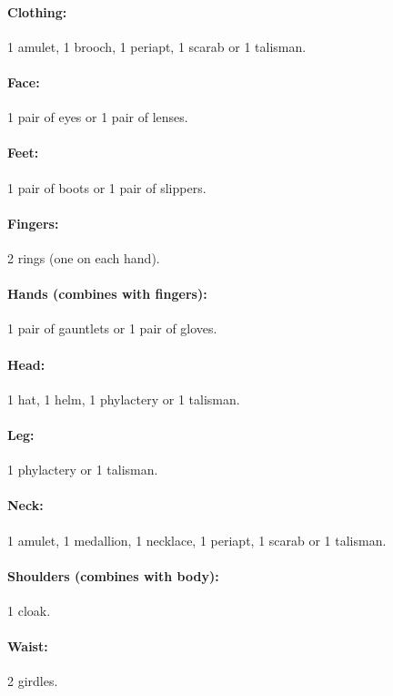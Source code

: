 \begin{multicols}{2}
\paragraph{Clothing:} 1 amulet, 1 brooch, 1 periapt, 1 scarab or 1 talisman.

\paragraph{Face:} 1 pair of eyes or 1 pair of lenses.

\paragraph{Feet:} 1 pair of boots or 1 pair of slippers.

\paragraph{Fingers:} 2 rings (one on each hand).

\paragraph{Hands (combines with fingers):} 1 pair of gauntlets or 1 pair of gloves.

\paragraph{Head:} 1 hat, 1 helm, 1 phylactery or 1 talisman.

\paragraph{Leg:} 1 phylactery or 1 talisman.

\paragraph{Neck:} 1 amulet, 1 medallion, 1 necklace, 1 periapt, 1 scarab or 1 talisman.

\paragraph{Shoulders (combines with body):} 1 cloak.

\paragraph{Waist:} 2 girdles.


\end{multicols}
